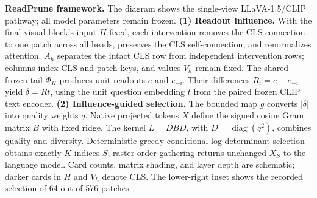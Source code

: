 \textbf{ReadPrune framework.} The diagram shows the single-view
LLaVA-1.5/CLIP pathway; all model parameters remain frozen.
\textbf{(1) Readout influence.} With the final visual block's input $H$ fixed,
each intervention removes the CLS connection to one patch across all heads,
preserves the CLS self-connection, and renormalizes attention.
$A_h$ separates the intact CLS row from independent intervention rows;
columns index CLS and patch keys, and values $V_h$ remain fixed.
The shared frozen tail $\Phi_H$ produces unit readouts $e$ and $e_{-i}$.
Their differences $R_i=e-e_{-i}$ yield $\delta=Rt$, using the unit question
embedding $t$ from the paired frozen CLIP text encoder.
\textbf{(2) Influence-guided selection.} The bounded map $g$ converts
$|\delta|$ into quality weights $q$. Native projected tokens $X$ define the
signed cosine Gram matrix $B$ with fixed ridge.
The kernel $L=DBD$, with $D=\operatorname{diag}(q^2)$, combines quality and diversity.
Deterministic greedy conditional log-determinant selection obtains exactly
$K$ indices $S$; raster-order gathering returns unchanged $X_S$ to the language model.
Card counts, matrix shading, and layer depth are schematic;
darker cards in $H$ and $V_h$ denote CLS.
The lower-right inset shows the recorded selection of 64 out of 576 patches.
